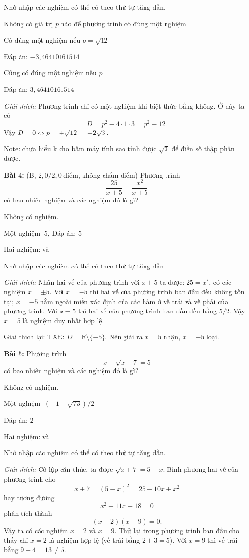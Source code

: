 \documentclass[12pt,a4paper]{article}
\begin{document}
Nhớ nhập các nghiệm có thể có theo thứ tự tăng dần.

Không có giá trị $p$ nào để phương trình có đúng một nghiệm.

Có đúng một nghiệm nếu $p = \sqrt{12}$

Đáp án: $-3{,}46410161514$

Cũng có đúng một nghiệm nếu $p = $

Đáp án: $3{,}46410161514$

\textit{Giải thích:} Phương trình chỉ có một nghiệm khi biệt thức bằng không. Ở đây ta có
\[
D = p^2 - 4\cdot 1\cdot 3 = p^2 - 12.
\]
Vậy $D = 0 \iff p = \pm\sqrt{12} = \pm 2\sqrt{3}$.

Note: chưa hiểu k cho bấm máy tính sao tính được $\sqrt{3}$ để điền số thập phân được.

\textbf{Bài 4:} (B, $2{,}0/2{,}0$ điểm, không chấm điểm)
Phương trình
\[
\dfrac{25}{x+5} = \dfrac{x^2}{x+5}
\]
có bao nhiêu nghiệm và các nghiệm đó là gì?

Không có nghiệm.

Một nghiệm: $5$, Đáp án: $5$

Hai nghiệm: và

Nhớ nhập các nghiệm có thể có theo thứ tự tăng dần.

\textit{Giải thích:} Nhân hai vế của phương trình với $x + 5$ ta được: $25 = x^2$, có các nghiệm $x = \pm 5$. Với $x = -5$ thì hai vế của phương trình ban đầu đều không tồn tại; $x = -5$ nằm ngoài miền xác định của các hàm ở vế trái và vế phải của phương trình. Với $x = 5$ thì hai vế của phương trình ban đầu đều bằng $5/2$. Vậy $x = 5$ là nghiệm duy nhất hợp lệ.

Giải thích lại: TXĐ: $D = \mathbb{R}\setminus\{-5\}$. Nên giải ra $x = 5$ nhận, $x = -5$ loại.

\textbf{Bài 5:}
Phương trình
\[
x + \sqrt{x+7} = 5
\]
có bao nhiêu nghiệm và các nghiệm đó là gì?

Không có nghiệm.

Một nghiệm: $(-1+\sqrt{73})/2$

Đáp án: $2$

Hai nghiệm: và

Nhớ nhập các nghiệm có thể có theo thứ tự tăng dần.

\textit{Giải thích:} Cô lập căn thức, ta được $\sqrt{x+7} = 5 - x$. Bình phương hai vế của phương trình cho
\[
x + 7 = (5-x)^2 = 25 - 10x + x^2
\]
hay tương đương
\[
x^2 - 11x + 18 = 0
\]
phân tích thành
\[
(x-2)(x-9) = 0.
\]
Vậy ta có các nghiệm $x = 2$ và $x = 9$. Thử lại trong phương trình ban đầu cho thấy chỉ $x = 2$ là nghiệm hợp lệ (vế trái bằng $2 + 3 = 5$). Với $x = 9$ thì vế trái bằng $9 + 4 = 13 \neq 5$.
\end{document}

